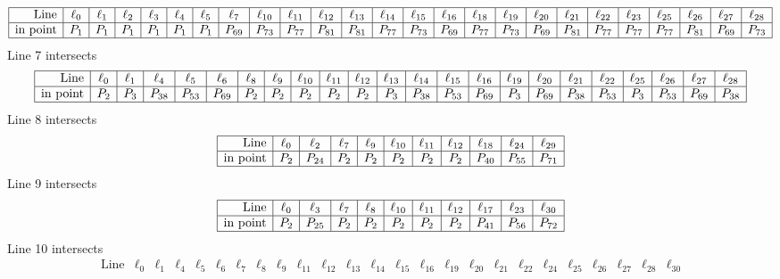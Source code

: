 \documentclass{article}
\begin{document}
{$$\begin{array}{|r*{24}{|c}|}
\hline
\mbox{Line}  & \ell_{0} & \ell_{1} & \ell_{2} & \ell_{3} & \ell_{4} & \ell_{5} & \ell_{7} & \ell_{10} & \ell_{11} & \ell_{12} & \ell_{13} & \ell_{14} & \ell_{15} & \ell_{16} & \ell_{18} & \ell_{19} & \ell_{20} & \ell_{21} & \ell_{22} & \ell_{23} & \ell_{25} & \ell_{26} & \ell_{27} & \ell_{28}\\
\hline
\mbox{in point}  & P_{1} & P_{1} & P_{1} & P_{1} & P_{1} & P_{1} & P_{69} & P_{73} & P_{77} & P_{81} & P_{81} & P_{77} & P_{73} & P_{69} & P_{77} & P_{73} & P_{69} & P_{81} & P_{77} & P_{77} & P_{77} & P_{81} & P_{69} & P_{73}\\
\hline
\end{array}
$$
Line 7 intersects 
$$
\begin{array}{|r*{22}{|c}|}
\hline
\mbox{Line}  & \ell_{0} & \ell_{1} & \ell_{4} & \ell_{5} & \ell_{6} & \ell_{8} & \ell_{9} & \ell_{10} & \ell_{11} & \ell_{12} & \ell_{13} & \ell_{14} & \ell_{15} & \ell_{16} & \ell_{19} & \ell_{20} & \ell_{21} & \ell_{22} & \ell_{25} & \ell_{26} & \ell_{27} & \ell_{28}\\
\hline
\mbox{in point}  & P_{2} & P_{3} & P_{38} & P_{53} & P_{69} & P_{2} & P_{2} & P_{2} & P_{2} & P_{2} & P_{3} & P_{38} & P_{53} & P_{69} & P_{3} & P_{69} & P_{38} & P_{53} & P_{3} & P_{53} & P_{69} & P_{38}\\
\hline
\end{array}
$$
Line 8 intersects 
$$
\begin{array}{|r*{10}{|c}|}
\hline
\mbox{Line}  & \ell_{0} & \ell_{2} & \ell_{7} & \ell_{9} & \ell_{10} & \ell_{11} & \ell_{12} & \ell_{18} & \ell_{24} & \ell_{29}\\
\hline
\mbox{in point}  & P_{2} & P_{24} & P_{2} & P_{2} & P_{2} & P_{2} & P_{2} & P_{40} & P_{55} & P_{71}\\
\hline
\end{array}
$$
Line 9 intersects 
$$
\begin{array}{|r*{10}{|c}|}
\hline
\mbox{Line}  & \ell_{0} & \ell_{3} & \ell_{7} & \ell_{8} & \ell_{10} & \ell_{11} & \ell_{12} & \ell_{17} & \ell_{23} & \ell_{30}\\
\hline
\mbox{in point}  & P_{2} & P_{25} & P_{2} & P_{2} & P_{2} & P_{2} & P_{2} & P_{41} & P_{56} & P_{72}\\
\hline
\end{array}
$$
Line 10 intersects 
$$
\begin{array}{|r*{24}{|c}|}
\hline
\mbox{Line}  & \ell_{0} & \ell_{1} & \ell_{4} & \ell_{5} & \ell_{6} & \ell_{7} & \ell_{8} & \ell_{9} & \ell_{11} & \ell_{12} & \ell_{13} & \ell_{14} & \ell_{15} & \ell_{16} & \ell_{19} & \ell_{20} & \ell_{21} & \ell_{22} & \ell_{24} & \ell_{25} & \ell_{26} & \ell_{27} & \ell_{28} & \ell_{30}\\

\end{array}$$}
\end{document}
